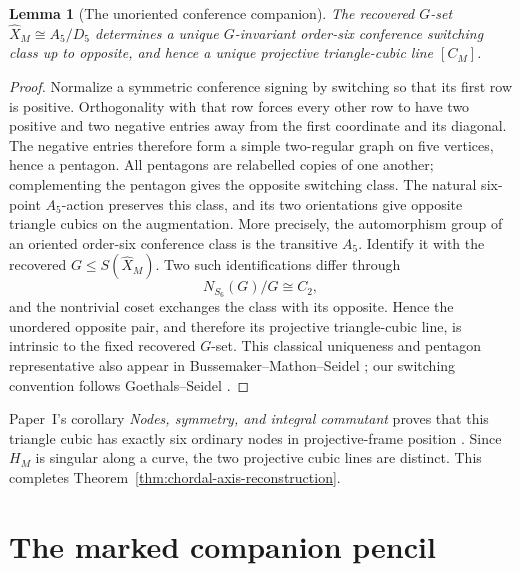 \documentclass[11pt]{article}
\newtheorem{lemma}[theorem]{Lemma}
\theoremstyle{definition}
\theoremstyle{remark}
\begin{document}
\begin{lemma}[The unoriented conference companion]
\label{lem:unoriented-conference-companion}
The recovered \(G\)-set \(\widehat X_M\cong A_5/D_5\) determines a unique
\(G\)-invariant order-six conference switching class up to opposite, and
hence a unique projective triangle-cubic line \([C_M]\).
\end{lemma}

\begin{proof}
Normalize a symmetric conference signing by switching so that its first row
is positive.  Orthogonality with that row forces every other row to have two
positive and two negative entries away from the first coordinate and its
diagonal.  The negative entries therefore form a simple two-regular graph on
five vertices, hence a pentagon.  All pentagons are relabelled copies of one
another; complementing the pentagon gives the opposite switching class.
The natural six-point \(A_5\)-action preserves this class, and its two
orientations give opposite triangle cubics on the augmentation.  More
precisely, the automorphism group of an oriented order-six conference class
is the transitive \(A_5\).  Identify it with the recovered
\(G\leq S(\widehat X_M)\).  Two such identifications differ through
\[
 N_{S_6}(G)/G\cong C_2,
\]
and the nontrivial coset exchanges the class with its opposite.  Hence the
unordered opposite pair, and therefore its projective triangle-cubic line,
is intrinsic to the fixed recovered \(G\)-set.  This classical uniqueness
and pentagon representative also appear in
Bussemaker--Mathon--Seidel
\cite[pp.~12, 21, and Table~9 on p.~83]{BMS1979}; our switching
convention follows Goethals--Seidel \cite[\S\S1--3]{GoethalsSeidel1967}.
\end{proof}

Paper~I's corollary \emph{Nodes, symmetry, and integral commutant} proves
that this triangle cubic has exactly six ordinary nodes in projective-frame
position \cite{RuddRigidity2026}.  Since \(H_M\)
is singular along a curve, the two projective cubic lines are distinct.  This
completes Theorem~\ref{thm:chordal-axis-reconstruction}.

\section{The marked companion pencil}
\label{sec:pencil}
\end{document}
